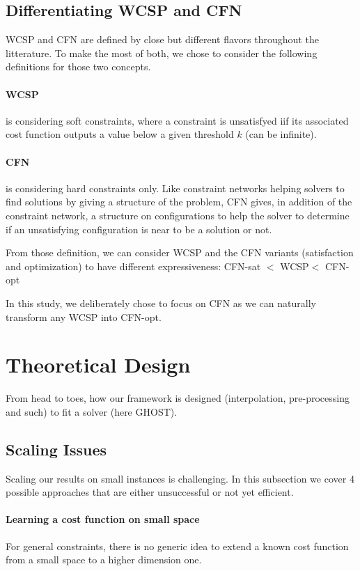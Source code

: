 \documentclass[letterpaper]{article} %
\newcommand{\cfn}{\textsc{CFN}\xspace}
\newcommand{\wcsp}{\textsc{WCSP}\xspace}
\begin{document}
\subsection{Differentiating \wcsp and \cfn}
\wcsp and \cfn are defined by close but different flavors throughout the litterature. To make the most of both, we chose to consider the following definitions for those two concepts.

\paragraph{\wcsp} is  considering soft  constraints, where  a constraint  is
  unsatisfyed iif its associated cost function outputs a value below a
  given threshold $k$ (can be infinite).

\paragraph{\cfn} is  considering  hard constraints  only.  Like  constraint
  networks helping solvers to find  solutions by giving a structure of
  the problem,  CFN gives,  in addition of  the constraint  network, a
  structure on  configurations to help  the solver to determine  if an
  unsatisfying configuration is near to be a solution or not.

From those definition, we can consider \wcsp and the \cfn variants (satisfaction and optimization) to have different expressiveness: \cfn-sat $<$ \wcsp $<$ \cfn-opt

In this study, we deliberately chose to focus on \cfn as we can naturally transform any \wcsp into \cfn-opt.

\section{Theoretical Design}\label{sec:theory}
From head to toes, how our framework is designed (interpolation, pre-processing and such) to fit a solver (here GHOST).

\subsection{Scaling Issues}\label{subsec:issues}
Scaling our results on small instances is challenging. In this subsection we cover 4 possible approaches that are either unsuccessful or not yet efficient.

\paragraph{Learning a cost function on small space}
For general constraints, there is no generic idea to extend a known cost
function from a small space to a higher dimension one.
\end{document}

